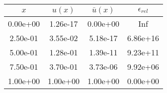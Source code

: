 \begin{tabular}{|c|c|c|c|}
\hline
\textbf{$x$}&\textbf{$u(x)$}&\textbf{$\bar{u}(x)$}&\textbf{$\epsilon_{rel}$}\\\hline
0.00e+00&1.26e-17&0.00e+00&Inf\\\hline
2.50e-01&3.55e-02&5.18e-17&6.86e+16\\\hline
5.00e-01&1.28e-01&1.39e-11&9.23e+11\\\hline
7.50e-01&3.70e-01&3.73e-06&9.92e+06\\\hline
1.00e+00&1.00e+00&1.00e+00&0.00e+00\\\hline
\end{tabular}
